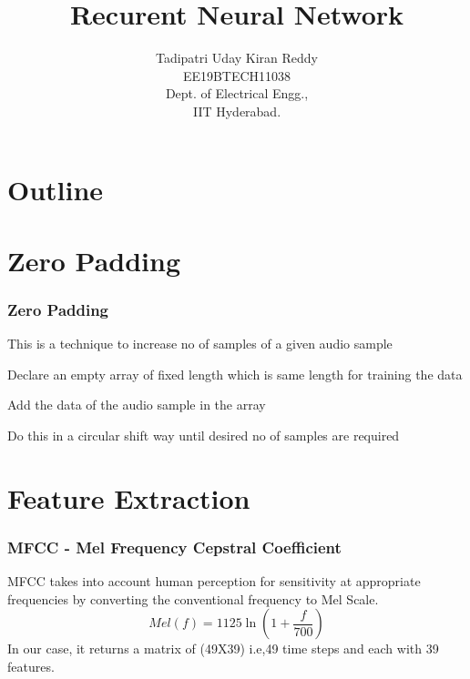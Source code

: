 \documentclass{beamer}
\title{Recurent Neural Network}
\author{Tadipatri Uday Kiran Reddy\\EE19BTECH11038 \\ Dept. of Electrical Engg.,\\IIT Hyderabad.}
\theoremstyle{remark}
\numberwithin{equation}{section}
\begin{document}
\begin{frame}
\titlepage
\end{frame}

\section*{Outline}
\begin{frame}
\tableofcontents
\end{frame}
\section{Zero Padding}
\begin{frame}
\frametitle{Zero Padding}
This is a technique to increase no of samples of a given audio sample
\begin{description}[font=$\bullet$~\normalfont\scshape\color{red!50!black}]
\item [] Declare an empty array of fixed length which is same length for training the data
\item [] Add the data of the audio sample in the array
\item [] Do this in a circular shift way until desired no of samples are required
\end{description}

\end{frame}

\section{Feature Extraction}
\begin{frame}
\frametitle{MFCC - Mel Frequency Cepstral Coefficient}
 MFCC takes into account human perception for sensitivity at appropriate frequencies by converting the conventional frequency to Mel Scale.\\
 \begin{equation*}
     Mel(f) = 1125\ln({1 + \frac{f}{700}})
 \end{equation*}
 In our case, it returns a matrix of (49X39) i.e,49 time steps and each with 39 features.
\end{frame}
\end{document}
